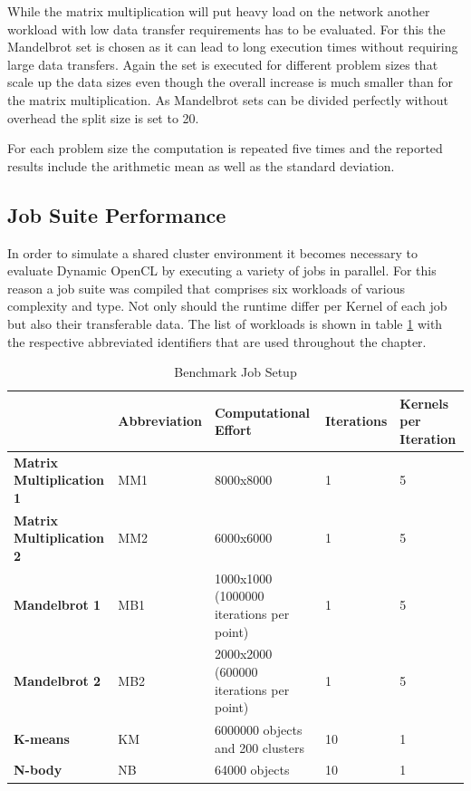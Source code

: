 While the matrix multiplication will put heavy load on the network another workload with low data transfer requirements has to be evaluated. For this the Mandelbrot set is chosen as it can lead to long execution times without requiring large data transfers. Again the set is executed for different problem sizes that scale up the data sizes even though the overall increase is much smaller than for the matrix multiplication. As Mandelbrot sets can be divided perfectly without overhead the split size is set to 20.

For each problem size the computation is repeated five times and the reported results include the arithmetic mean as well as the standard deviation. 

\subsection{Job Suite Performance}

In order to simulate a shared cluster environment it becomes necessary to evaluate Dynamic OpenCL by executing a variety of jobs in parallel. For this reason a job suite was compiled that comprises six workloads of various complexity and type. Not only should the runtime differ per Kernel of each job but also their transferable data. The list of workloads is shown in table \ref{table:benchmark_job_setup} with the respective abbreviated identifiers that are used throughout the chapter.

\begin{table}[!htb]
	\centering
	\begin{adjustbox}{width=0.95\textwidth}
		\small
		\begin{tabular}{l | l | l | l | l}
			~ & \textbf{Abbreviation}						& \textbf{Computational Effort}		& \textbf{Iterations}	& \textbf{Kernels per Iteration} \\
			\hline
			\textbf{Matrix Multiplication 1}	& MM1  	& 8000x8000  								& 1 	& 5 \\
			\textbf{Matrix Multiplication 2} 	& MM2	& 6000x6000  								& 1		& 5 \\
			\textbf{Mandelbrot 1}     		 	& MB1	& 1000x1000 (1000000 iterations per point) 	& 1		& 5 \\
			\textbf{Mandelbrot 2}				& MB2	& 2000x2000 (600000 iterations per point)  	& 1		& 5 \\
			\textbf{K-means}          			& KM 	& 6000000 objects and 200 clusters  		& 10	& 1 \\
			\textbf{N-body}    		 			& NB 	& 64000 objects  							& 10	& 1 \\		
		\end{tabular}
	\end{adjustbox}
	
	\caption{Benchmark Job Setup}
	\label{table:benchmark_job_setup}
\end{table}

